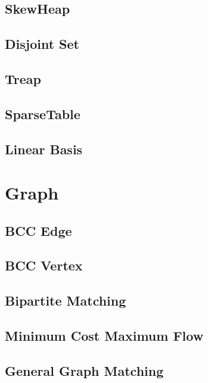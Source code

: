 \documentclass[a4paper,10pt,twocolumn,oneside]{article}
\begin{document}
\subsection{SkewHeap}

\subsection{Disjoint Set}

\subsection{Treap}

\subsection{SparseTable}

\subsection{Linear Basis}


\section{Graph}
\subsection{BCC Edge}

\subsection{BCC Vertex}

\subsection{Bipartite Matching}

\subsection{Minimum Cost Maximum Flow}

\subsection{General Graph Matching}

\end{document}
